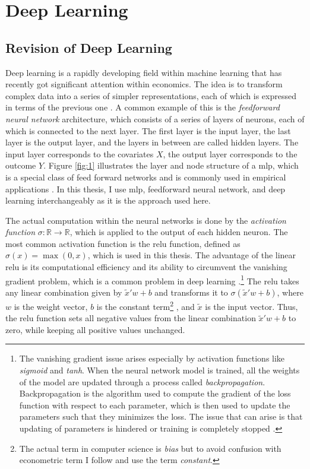 \section{Deep Learning}

\subsection{Revision of Deep Learning}
Deep learning is a rapidly developing field within machine learning that has recently got significant attention within economics.
The idea is to transform complex data into a series of simpler representations, each of which is expressed in terms of the previous one \citep{Goodfellow-et-al-2016}.
A common example of this is the \textit{feedforward neural network} architecture, which consists of a series of layers of neurons, each of which is connected to the next layer.
The first layer is the input layer, the last layer is the output layer, and the layers in between are called hidden layers.
The input layer corresponds to the covariates $X$, the output layer corresponds to the outcome $Y$.
Figure \ref{fig:1} illustrates the layer and node structure of a \ac{mlp}, which is a special class of feed forward networks and is commonly used in empirical applications \citep{farrellDeepNeuralNetworks2021}.
In this thesis, I use \ac{mlp}, feedforward neural network, and deep learning interchangeably as it is the approach used here.

The actual computation within the neural networks is done by the \textit{activation function} $ \sigma : \mathbb{R} \to \mathbb{R} $, which is applied to the output of each hidden neuron.
The most common activation function is the \ac{relu} function, defined as $ \sigma(x) = \max(0, x) $, which is used in this thesis.
The advantage of the linear \ac{relu} is its computational efficiency and its ability to circumvent the vanishing gradient problem, which is a common problem in deep learning \citep{10.1214/19-AOS1875}.\footnote[1]{The vanishing gradient issue arises especially by activation functions like \textit{sigmoid} and \textit{tanh}.
When the neural network model is trained, all the weights of the model are updated through a process called \textit{backpropagation}.
Backpropagation is the algorithm used to compute the gradient of the loss function with respect to each parameter, which is then used to update the parameters such that they minimizes the loss.
The issue that can arise is that updating of parameters is hindered or training is completely stopped \citep{abuqaddom2021oriented}.}
The \ac{relu} takes any linear combination given by $\tilde{x}' w + b$ and transforms it to $ \sigma(\tilde{x}' w + b)$, where $w$ is the weight vector, $b$ is the constant term\footnote[2]{The actual term in computer science is \textit{bias} but to avoid confusion with econometric term I follow \citet{farrellDeepNeuralNetworks2021} and use the term \textit{constant}.}
, and $\tilde{x}$ is the input vector.
Thus, the \ac{relu} function sets all negative values from the linear combination $\tilde{x}' w + b$ to zero, while keeping all positive values unchanged.

